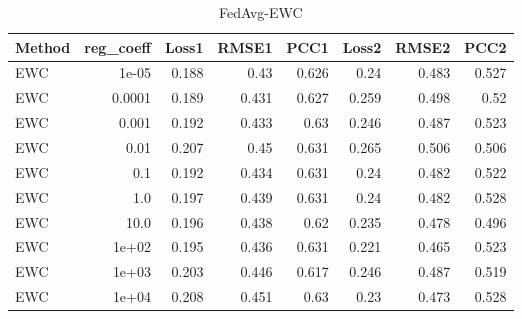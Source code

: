 \begin{table}
\caption{FedAvg-EWC}
\begin{tabular}{lrrrrrrr}
\toprule
Method & reg_coeff & Loss1 & RMSE1 & PCC1 & Loss2 & RMSE2 & PCC2 \\
\midrule
EWC & 1e-05 & 0.188 & 0.43 & 0.626 & 0.24 & 0.483 & 0.527 \\
EWC & 0.0001 & 0.189 & 0.431 & 0.627 & 0.259 & 0.498 & 0.52 \\
EWC & 0.001 & 0.192 & 0.433 & 0.63 & 0.246 & 0.487 & 0.523 \\
EWC & 0.01 & 0.207 & 0.45 & 0.631 & 0.265 & 0.506 & 0.506 \\
EWC & 0.1 & 0.192 & 0.434 & 0.631 & 0.24 & 0.482 & 0.522 \\
EWC & 1.0 & 0.197 & 0.439 & 0.631 & 0.24 & 0.482 & 0.528 \\
EWC & 10.0 & 0.196 & 0.438 & 0.62 & 0.235 & 0.478 & 0.496 \\
EWC & 1e+02 & 0.195 & 0.436 & 0.631 & 0.221 & 0.465 & 0.523 \\
EWC & 1e+03 & 0.203 & 0.446 & 0.617 & 0.246 & 0.487 & 0.519 \\
EWC & 1e+04 & 0.208 & 0.451 & 0.63 & 0.23 & 0.473 & 0.528 \\
\bottomrule
\end{tabular}
\end{table}
